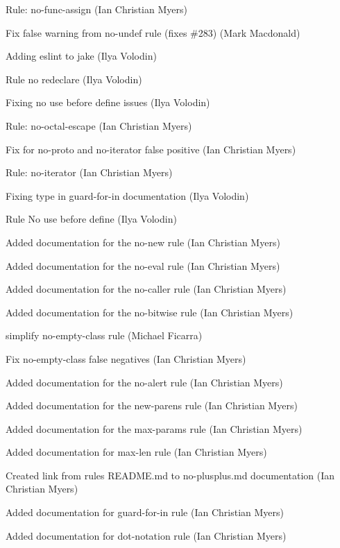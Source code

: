 \begin{DoxyItemize}
\item Rule\+: no-\/func-\/assign (Ian Christian Myers)
\item Fix false warning from no-\/undef rule (fixes \#283) (Mark Macdonald)
\item Adding eslint to jake (Ilya Volodin)
\item Rule no redeclare (Ilya Volodin)
\item Fixing no use before define issues (Ilya Volodin)
\item Rule\+: no-\/octal-\/escape (Ian Christian Myers)
\item Fix for {\ttfamily no-\/proto} and {\ttfamily no-\/iterator} false positive (Ian Christian Myers)
\item Rule\+: no-\/iterator (Ian Christian Myers)
\item Fixing type in guard-\/for-\/in documentation (Ilya Volodin)
\item Rule No use before define (Ilya Volodin)
\item Added documentation for the {\ttfamily no-\/new} rule (Ian Christian Myers)
\item Added documentation for the {\ttfamily no-\/eval} rule (Ian Christian Myers)
\item Added documentation for the {\ttfamily no-\/caller} rule (Ian Christian Myers)
\item Added documentation for the {\ttfamily no-\/bitwise} rule (Ian Christian Myers)
\item simplify no-\/empty-\/class rule (Michael Ficarra)
\item Fix {\ttfamily no-\/empty-\/class} false negatives (Ian Christian Myers)
\item Added documentation for the {\ttfamily no-\/alert} rule (Ian Christian Myers)
\item Added documentation for the {\ttfamily new-\/parens} rule (Ian Christian Myers)
\item Added documentation for the {\ttfamily max-\/params} rule (Ian Christian Myers)
\item Added documentation for {\ttfamily max-\/len} rule (Ian Christian Myers)
\item Created link from rules R\+E\+A\+D\+M\+E.\+md to no-\/plusplus.\+md documentation (Ian Christian Myers)
\item Added documentation for {\ttfamily guard-\/for-\/in} rule (Ian Christian Myers)
\item Added documentation for {\ttfamily dot-\/notation} rule (Ian Christian Myers)

\end{DoxyItemize}

